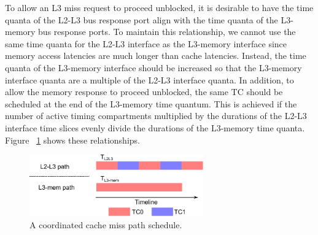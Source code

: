 To allow an L3 miss request to proceed unblocked, it is desirable to have the time 
quanta of the L2-L3 bus response port align with the time quanta of the 
L3-memory bus response ports. To maintain this relationship, we cannot use the 
same time quanta for the L2-L3 interface as the L3-memory interface since 
memory access latencies are much longer than cache latencies. Instead, the time 
quanta of the L3-memory interface should be increased so that the L3-memory 
interface quanta are a multiple of the L2-L3 interface quanta. 
In addition, to allow the memory response to proceed unblocked, the same TC 
should be scheduled at the end of the L3-memory time quantum. This is
achieved if the number of active timing compartments multiplied by the 
durations of the L2-L3 interface time slices evenly divide the
durations of the L3-memory time quanta.
Figure 
~\ref{fig:coordination} shows these relationships.


\begin{figure}
    \begin{center}
        \includegraphics[width=2.9475in]{figs/coordination.eps}
        \caption{A coordinated cache miss path schedule.}
        \label{fig:coordination}
    \end{center}
\end{figure}

